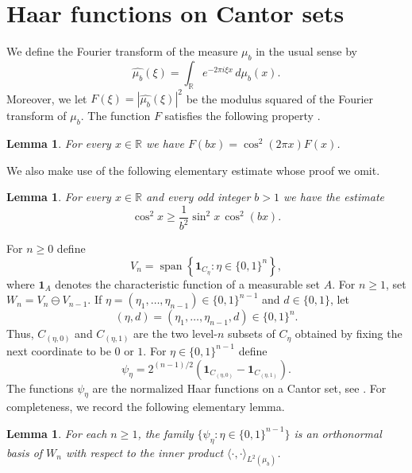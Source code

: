 \documentclass[reqno,a4paper,12pt]{amsart}
\newtheorem{lemma}[definition]{Lemma}
\def\R{{\mathbb R}}
\newcommand{\one}{\mathbf 1}
\newcommand{\Span}{\operatorname{span}}
\begin{document}
\section{Haar functions on Cantor sets}

We define the Fourier transform of the measure $\mu_b$ in the usual sense by
$$
\widehat{\mu_b}(\xi)=
        \int_{\R}e^{-2\pi i\xi x}\,d\mu_b(x).
$$
Moreover, we let $F(\xi)=|\widehat{\mu_b}(\xi)|^2$ be the modulus squared of the Fourier transform of $\mu_b$. The function $F$ satisfies the following property \cite[Section 7]{JorgensenPedersen98}.

\begin{lemma}\label{FS:Lemma}
    For every $x \in \R$ we have $F(bx)=\cos^2(2\pi x)F(x)$.
\end{lemma}

We also make use of the following elementary estimate whose proof we omit. 

\begin{lemma}\label{lemma:trig}
    For every $x \in \R$ and every odd integer $b > 1$ we have the estimate $$\cos^2 x\ge \frac1{b^2}\sin^2 x\,\cos^2(bx).$$
\end{lemma}

For $n\ge0$ define
$$
        V_n=\Span \left \{\one_{C_\eta}: \eta \in \{ 0,1 \}^n \right \},
$$
where $\one_A$ denotes the characteristic function of a measurable set $A$.
For $n\ge1$, set $W_n=V_n\ominus V_{n-1}$. 
If
$\eta=(\eta_1,\ldots,\eta_{n-1})\in\{0,1\}^{n-1}$ and
$d\in\{0,1\}$, let
$$
        (\eta,d)=(\eta_1,\ldots,\eta_{n-1},d)\in\{0,1\}^n.
$$
Thus, $C_{(\eta,0)}$ and $C_{(\eta,1)}$ are the two level-$n$ subsets
of $C_\eta$ obtained by fixing the next coordinate to be $0$ or $1$.
For $\eta\in\{0,1\}^{n-1}$ define
$$
        \psi_\eta
        =
        2^{(n-1)/2}\left(\one_{C_{(\eta,0)}}-\one_{C_{(\eta,1)}}\right).
$$
The functions $\psi_\eta$ are the normalized Haar functions on a Cantor set, see \cite[p.~502]{guo2014boundary}. For completeness, we record
the following elementary lemma.

\begin{lemma}
    For each $n\ge1$, the family
$
        \{\psi_\eta:\eta\in\{0,1\}^{n-1}\}
$
is an orthonormal basis of $W_n$ with respect to the inner product $\langle \cdot, \cdot \rangle_{L^2(\mu_b)}$.
\end{lemma}
\end{document}
